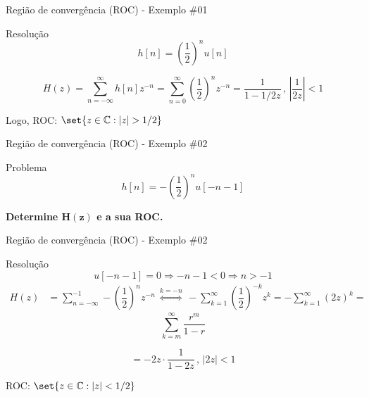 \begin{frame}{Região de convergência (ROC) - Exemplo \#01}
\begin{center}
	\scalebox{1}{}
\end{center}

\begin{block}{Resolução}
	$$ h[n]=\left( \dfrac{1}{2} \right)^{n}u[n] $$
	
	\[ H(z)=\sum_{n=-\infty}^{\infty}h[n]z^{-n}=\sum_{n=0}^{\infty}\left( \dfrac{1}{2} \right)^{n}z^{-n}=\dfrac{1}{1-1/2z}\, , \, \left| \dfrac{1}{2z} \right|<1  \]
	
	\vspace{0.5cm}
	
	Logo, ROC: $ \set{z\in\mathbb{C}:|z|>1/2} $
	
\end{block}
\end{frame}


\begin{frame}{Região de convergência (ROC) - Exemplo \#02}
\begin{center}
	\scalebox{1}{}
\end{center}

\begin{block}{Problema}
	$$ h[n]=-\left( \dfrac{1}{2}\right)^{n}u[-n-1] $$
	
	\textbf{Determine $ \bm{H(z)} $ e a sua ROC.}
\end{block}
\end{frame}


\begin{frame}{Região de convergência (ROC) - Exemplo \#02}
\begin{block}{Resolução}
	\[ u[-n-1]=0 \Rightarrow -n-1<0 \Rightarrow n>-1 \]
	\begin{align*}
	H(z)&=\sum_{n=-\infty}^{-1}-\left( \dfrac{1}{2}\right)^{n}z^{-n} \,\overset{k=-n}{\Longleftrightarrow}\, -\sum_{k=1}^{\infty}\left( \dfrac{1}{2}\right)^{-k}z^{k}=-\sum_{k=1}^{\infty}(2z)^{k}=
	\end{align*}
	\[ \boxed{\sum_{k=m}^{\infty}\dfrac{r^{m}}{1-r}} \]
	
	\[ =-2z\cdot\dfrac{1}{1-2z}\, , \, \left| 2z \right| < 1  \]
	
	\vspace{0.5cm}
	
	ROC: $ \set{z\in\mathbb{C} : |z| < 1/2} $
\end{block}
\end{frame}


